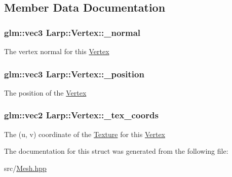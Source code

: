 \subsection{Member Data Documentation}
\hypertarget{structLarp_1_1Vertex_aefb3ec6fe143142c52dd48353c391b27}{
\subsubsection[{\-\_\-normal}]{\setlength{\rightskip}{0pt plus 5cm}glm\-::vec3 Larp\-::\-Vertex\-::\-\_\-normal}}\label{structLarp_1_1Vertex_aefb3ec6fe143142c52dd48353c391b27}
The vertex normal for this \hyperlink{structLarp_1_1Vertex}{Vertex} \hypertarget{structLarp_1_1Vertex_a271f825c3a02f11e49a16f2432f62765}{
\subsubsection[{\-\_\-position}]{\setlength{\rightskip}{0pt plus 5cm}glm\-::vec3 Larp\-::\-Vertex\-::\-\_\-position}}\label{structLarp_1_1Vertex_a271f825c3a02f11e49a16f2432f62765}
The position of the \hyperlink{structLarp_1_1Vertex}{Vertex} \hypertarget{structLarp_1_1Vertex_aa3c59b04ad38f2861683c2784bc137fd}{
\subsubsection[{\-\_\-tex\-\_\-coords}]{\setlength{\rightskip}{0pt plus 5cm}glm\-::vec2 Larp\-::\-Vertex\-::\-\_\-tex\-\_\-coords}}\label{structLarp_1_1Vertex_aa3c59b04ad38f2861683c2784bc137fd}
The (u, v) coordinate of the \hyperlink{classLarp_1_1Texture}{Texture} for this \hyperlink{structLarp_1_1Vertex}{Vertex} 

The documentation for this struct was generated from the following file\-:\begin{DoxyCompactItemize}
\item 
src/\hyperlink{Mesh_8hpp}{Mesh.\-hpp}\end{DoxyCompactItemize}
